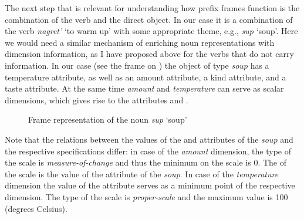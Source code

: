 \pagebreak The next step that is relevant for understanding how prefix frames function is the combination of the verb and the direct object. In our case it is a combination of the verb \textit{nagret'} `to warm up' with some appropriate theme, e.g., \textit{sup} `soup'. Here we would need a similar mechanism of enriching noun representations with dimension information, as I have proposed above for the verbs that do not carry  information. In our case (see the frame on ) the object of type \textit{soup} has a temperature attribute, as well as an amount attribute, a kind attribute, and a taste attribute. At the same time \textit{amount} and \textit{temperature} can serve as scalar dimensions, which gives rise to the attributes \AMOUNTDIM and \TEMPDIM.  

\begin{figure}
\centering
{}
\caption{Frame representation of the noun \textit{sup} `soup' \label{frame:soup:dic}}
\end{figure}

Note that the relations between the values of the \AMOUNT and \TEMP attributes of the \textit{soup} and the respective  specifications differ:  in case of the \textit{amount} dimension, the type of the scale is \textit{measure-of-change} and thus the minimum on the scale is 0. The  of the scale is the value of the \AMOUNT attribute of the \textit{soup}. In case of the \textit{temperature} dimension the value of the \TEMP attribute serves as a minimum point of the respective dimension. The type of the scale is \textit{proper-scale} and the maximum value is 100 (degrees Celsius).

